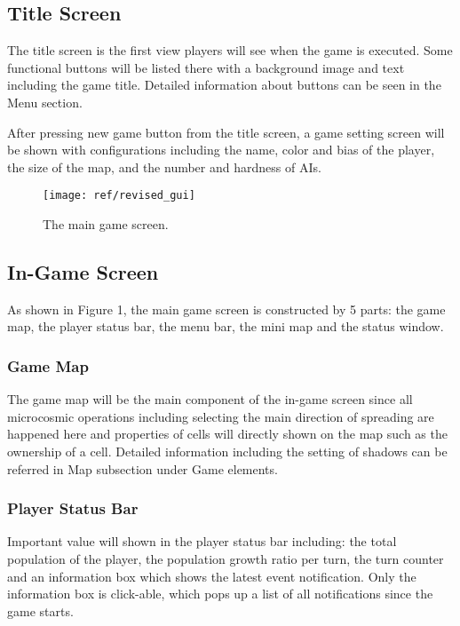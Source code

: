 \documentclass[12pt,a4paper]{article}
\begin{document}
\subsection{Title Screen}
The title screen is the first view players will see when the game is executed. Some functional buttons will be listed there with a background image and text including the game title. Detailed information about buttons can be seen in the Menu section.

After pressing new game button from the title screen, a game setting screen will be shown with configurations including the name, color and bias of the player, the size of the map, and the number and hardness of AIs.

\begin{figure}[h!]
	\begin{center}
	\texttt{[image: ref/revised\_gui]}
	\caption{The main game screen.}
	\end{center}
\end{figure}

\subsection{In-Game Screen}
As shown in Figure 1, the main game screen is constructed by 5 parts: the game map, the player status bar, the menu bar, the mini map and the status window.

\subsubsection{Game Map}
The game map will be the main component of the in-game screen since all microcosmic operations including selecting the main direction of spreading are happened here and properties of cells will directly shown on the map such as the ownership of a cell. Detailed information including the setting of shadows can be referred in Map subsection under Game elements.

\subsubsection{Player Status Bar}
Important value will shown in the player status bar including: the total population of the player, the population growth ratio per turn, the turn counter and an information box which shows the latest event notification. Only the information box is click-able, which pops up a list of all notifications since the game starts.
\end{document}
